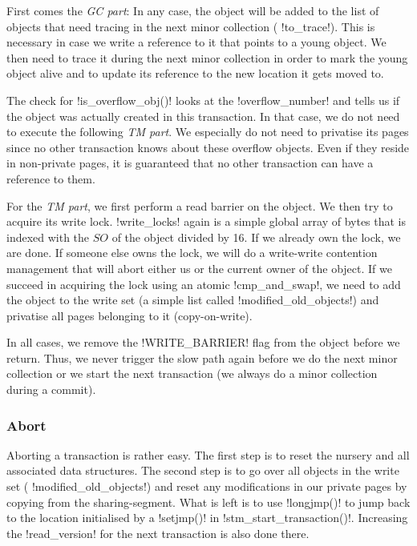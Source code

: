 \documentclass{sigplanconf}
\makeatletter
\renewcommand\lstinline[1][]{%
  \Collectverb{\@@myverb}%
}
\def\@@myverb#1{%
    \begingroup
    \fboxsep=0.2em
    \colorbox{verylightgray}{\oldlstinline|#1|}%
    \endgroup
}
\makeatother
\begin{document}
First comes the \emph{GC part}: In any case, the object will be added
to the list of objects that need tracing in the next minor collection
(\lstinline!to_trace!).  This is necessary in case we write a
reference to it that points to a young object. We then need to trace
it during the next minor collection in order to mark the young object
alive and to update its reference to the new location it gets moved
to.

The check for \lstinline!is_overflow_obj()! looks at the
\lstinline!overflow_number!  and tells us if the object was actually
created in this transaction. In that case, we do not need to execute
the following \emph{TM part}.  We especially do not need to privatise
its pages since no other transaction knows about these overflow
objects. Even if they reside in non-private pages, it is guaranteed
that no other transaction can have a reference to them.

For the \emph{TM part}, we first perform a read barrier on the
object. We then try to acquire its write lock. \lstinline!write_locks!
again is a simple global array of bytes that is indexed with the $SO$
of the object divided by 16. If we already own the lock, we are done.
If someone else owns the lock, we will do a write-write contention
management that will abort either us or the current owner of the
object.  If we succeed in acquiring the lock using an atomic
\lstinline!cmp_and_swap!, we need to add the object to the write set
(a simple list called \lstinline!modified_old_objects!)  and privatise
all pages belonging to it (copy-on-write).

In all cases, we remove the \lstinline!WRITE_BARRIER!  flag from the
object before we return. Thus, we never trigger the slow path again
before we do the next minor collection or we start the next
transaction (we always do a minor collection during a commit).


\subsubsection{Abort}

Aborting a transaction is rather easy. The first step is to reset the
nursery and all associated data structures. The second step is to go
over all objects in the write set (\lstinline!modified_old_objects!)
and reset any modifications in our private pages by copying from the
sharing-segment. What is left is to use \lstinline!longjmp()!  to jump
back to the location initialised by a \lstinline!setjmp()!  in
\lstinline!stm_start_transaction()!.  Increasing the
\lstinline!read_version! for the next transaction is also done there.
\end{document}

